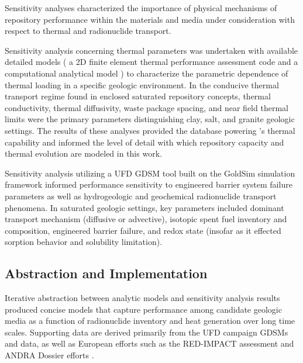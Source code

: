 Sensitivity analyses characterized the importance of physical mechanisms of 
repository performance  within the materials and media under consideration with 
respect to thermal and radionuclide transport.

Sensitivity analysis concerning thermal parameters was undertaken with available 
detailed models ( a 2D finite element thermal performance assessment code 
\cite{huff_thermal_2012} and a computational analytical model 
\cite{greenberg_application_2011}) to characterize the parametric dependence of 
thermal loading in a specific geologic environment.  In the conducive thermal 
transport regime found in enclosed saturated repository concepts, thermal 
conductivity, thermal diffusivity, waste package spacing, and near field thermal 
limits were the primary parameters distinguishing clay, salt, and granite 
geologic settings. The results of these analyses provided the database powering 
\Cyder's thermal capability and informed the level of detail with which 
repository capacity and thermal evolution are modeled in this work.  

Sensitivity analysis utilizing a \gls{UFD} \gls{GDSM} tool built on the 
GoldSim simulation framework informed performance sensitivity to engineered 
barrier system failure parameters as well as hydrogeologic and geochemical 
radionuclide transport phenomena. In saturated geologic settings, key parameters 
included dominant transport mechanism (diffusive or 
advective), isotopic spent fuel inventory and composition, engineered barrier 
failure, and redox state (insofar as it effected sorption behavior and 
solubility limitation).

\subsection{Abstraction and Implementation}


Iterative abstraction between analytic models and sensitivity analysis results 
produced concise models that capture performance among candidate geologic media 
as a function of radionuclide inventory and heat generation over long time 
scales. Supporting data are derived primarily from the \gls{UFD} campaign 
\glspl{GDSM} and data, as well as European efforts such as the RED-IMPACT 
assessment and \gls{ANDRA} Dossier efforts \cite{von_lensa_red-impact_2008, 
andra_argile:_2005, clayton_generic_2011} . 

